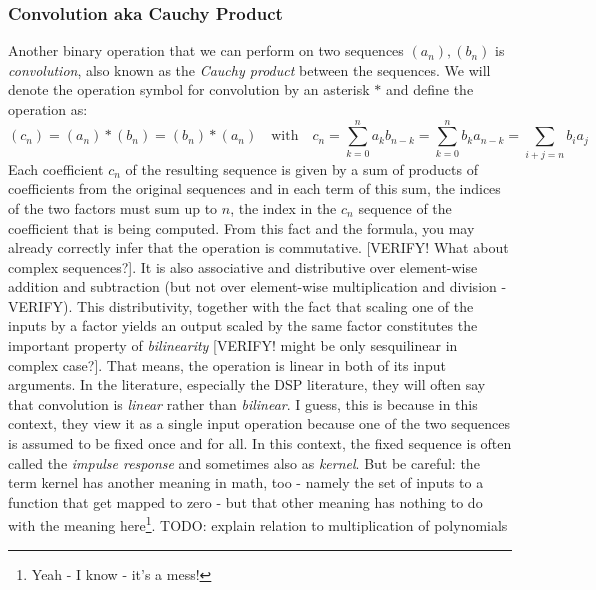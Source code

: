 \subsubsection{Convolution aka Cauchy Product}
Another binary operation that we can perform on two sequences $(a_n),(b_n)$ is \emph{convolution}, also known as the \emph{Cauchy product} between the sequences. We will denote the operation symbol for convolution by an asterisk $\ast$ and define the operation as:
\begin{equation}
 (c_n) = (a_n) \ast (b_n) = (b_n) \ast (a_n) \quad \text{with} \quad
 c_n = \sum_{k=0}^n a_k b_{n-k} 
     = \sum_{k=0}^n b_k a_{n-k}
     = \sum_{i+j=n} b_i a_j
\end{equation}
Each coefficient $c_n$ of the resulting sequence is given by a sum of products of coefficients from the original sequences and in each term of this sum, the indices of the two factors must sum up to $n$, the index in the $c_n$ sequence of the coefficient that is being computed. From this fact and the formula, you may already correctly infer that the operation is commutative.
[VERIFY! What about complex sequences?]. It is also associative and distributive over element-wise addition and subtraction (but not over element-wise multiplication and division - VERIFY). This distributivity, together with the fact that scaling one of the inputs by a factor yields an output scaled by the same factor constitutes the important property of \emph{bilinearity} [VERIFY! might be only sesquilinear in complex case?]. That means, the operation is linear in both of its input arguments. In the literature, especially the DSP literature, they will often say that convolution is \emph{linear} rather than \emph{bilinear}. I guess, this is because in this context, they view it as a single input operation because one of the two sequences is assumed to be fixed once and for all. In this context, the fixed sequence is often called the \emph{impulse response} and sometimes also as \emph{kernel}. But be careful: the term kernel has another meaning in math, too - namely the set of inputs to a function that get mapped to zero - but that other meaning has nothing to do with the meaning here\footnote{Yeah - I know - it's a mess!}. TODO: explain relation to multiplication of polynomials



